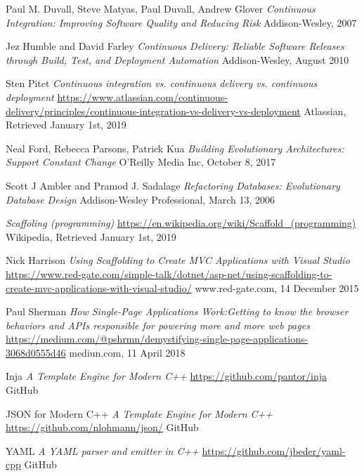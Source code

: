 \documentclass[]{article}
\begin{document}
\begin{thebibliography}{9}
Paul M. Duvall, Steve Matyas, Paul Duvall, Andrew Glover
\textit{Continuous Integration: Improving Software Quality and Reducing Risk}
Addison-Wesley, 2007

Jez Humble and David Farley
\textit{Continuous Delivery: Reliable Software Releases through Build, Test, and Deployment Automation}
Addison-Wesley, August 2010

Sten Pitet
\textit{Continuous integration vs. continuous delivery vs. continuous deployment}
\url{https://www.atlassian.com/continuous-delivery/principles/continuous-integration-vs-delivery-vs-deployment}
Atlassian, Retrieved January 1st, 2019

Neal Ford, Rebecca Parsons, Patrick Kua
\textit{Building Evolutionary Architectures: Support Constant Change}
O'Reilly Media Inc, October 8, 2017

Scott J Ambler and Pramod J. Sadalage
\textit{Refactoring Databases: Evolutionary Database Design}
Addison-Wesley Professional, March 13, 2006

\textit{Scaffoling (programming)}
\url{https://en.wikipedia.org/wiki/Scaffold_(programming)}
Wikipedia, Retrieved January 1st, 2019

Nick Harrison
\textit{Using Scaffolding to Create MVC Applications with Visual Studio}
\url{https://www.red-gate.com/simple-talk/dotnet/asp-net/using-scaffolding-to-create-mvc-applications-with-visual-studio/}
www.red-gate.com, 14 December 2015

Paul Sherman
\textit{How Single-Page Applications Work:Getting to know the browser behaviors and APIs responsible for powering more and more web pages}
\url{https://medium.com/@pshrmn/demystifying-single-page-applications-3068d0555d46}
mediun.com, 11 April 2018

Inja
\textit{A Template Engine for Modern C++}
\url{https://github.com/pantor/inja}
GitHub

JSON for Modern C++
\textit{A Template Engine for Modern C++}
\url{https://github.com/nlohmann/json/}
GitHub

YAML
\textit{A YAML parser and emitter in C++ }
\url{https://github.com/jbeder/yaml-cpp}
GitHub

\end{thebibliography}
\end{document}
